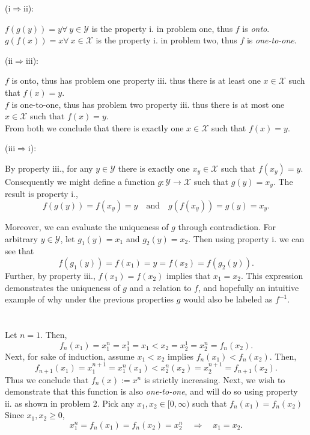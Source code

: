 \documentclass[12 pt,letterpaper]{article}
\begin{document}
\noindent
(i\(\Rightarrow\)ii):

\noindent
\(f(g(y))=y\forall\ y\in\mathcal{Y}\) is the property i. in problem one,
thus \(f\) is \emph{onto}. \\
\(g(f(x))=x\forall\ x\in\mathcal{X}\) is the property i. in problem two,
thus \(f\) is \emph{one-to-one}.

\vspace{5pt}\noindent
(ii\(\Rightarrow\)iii):

\noindent
\(f\) is onto, thus has problem one property iii. 
thus there is at least one \(x\in\mathcal{X}\) such that \(f(x)=y\).\\
\(f\) is one-to-one, thus has problem two property iii. 
thus there is at most one \(x\in\mathcal{X}\) such that \(f(x)=y\).\\
From both we conclude that there is exactly one \(x\in\mathcal{X}\) such that \(f(x)=y\).

\vspace{5pt}\noindent
(iii\(\Rightarrow\)i):

By property iii., for any \(y\in\mathcal{Y}\)
there is exactly one \(x_y\in\mathcal{X}\) such that \(f(x_y)=y\).
Consequently we might define a function \(g:\mathcal{Y}\rightarrow\mathcal{X}\)
such that \(g(y)=x_y\).
The result is property i.,
\[
    f(g(y)) = f(x_y) = y
    \quad\text{and}\quad
    g(f(x_y)) = g(y) = x_y.
\]

Moreover, we can evaluate the uniqueness of \(g\) through contradiction.
For arbitrary \(y\in\mathcal{Y}\), let \(g_1(y) = x_1\) and \(g_2(y) = x_2\).
Then using property i. we can see that
\[
    f(g_1(y)) = f(x_1) = y = f(x_2) = f(g_2(y)).
\]
Further, by property iii., \(f(x_1) = f(x_2)\) implies that \(x_1 = x_2\).
This expression demonstrates the uniqueness of \(g\) and a relation to \(f\),
and hopefully an intuitive example of why under the previous properties \(g\)
would also be labeled as \(f^{-1}\).

\section{}

Let \(n=1\). Then,
\[f_n(x_1) = x_1^n = x_1^1 = x_1 < x_2 = x_2^1 = x_2^n = f_n(x_2).\]
Next, for sake of induction, assume \(x_1 < x_2\) implies \(f_n(x_1) < f_n(x_2)\). Then,
\[ f_{n+1}(x_1) = x_1^{n+1} = x_1^{n}(x_1) < x_2^{n}(x_2) = x_2^{n+1} = f_{n+1}(x_2). \]
Thus we conclude that \(f_n(x) := x^n\) is strictly increasing.
Next, we wish to demonstrate that this function is also \emph{one-to-one},
and will do so using property ii. as shown in problem 2.
%
Pick any \(x_1,x_2\in[0,\infty)\) such that \(f_n(x_1) = f_n(x_2)\)
Since \(x_1,x_2 \geq 0\),
\[x_1^n = f_n(x_1) = f_n(x_2) = x_2^n \quad\Rightarrow\quad x_1 = x_2.\]
\end{document}
